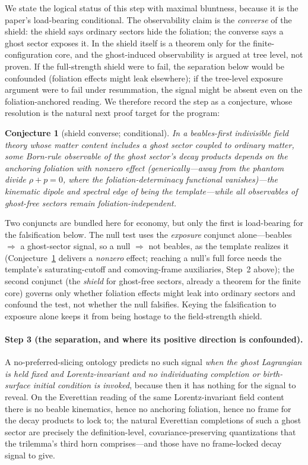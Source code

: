 \documentclass[11pt]{article}
\newtheorem{conjecture}{Conjecture}
\theoremstyle{remark}
\begin{document}
We state the logical status of this step with maximal bluntness,
because it is the paper's load-bearing conditional. The observability
claim is the \emph{converse} of the shield: the shield says ordinary
sectors hide the foliation; the converse says a ghost sector exposes
it. In \cite{instantaneous} the shield itself is a theorem only for
the finite-configuration core, and the ghost-induced observability is
argued at tree level, not proven. If the full-strength shield were to
fail, the separation below would be confounded (foliation effects
might leak elsewhere); if the tree-level exposure argument were to
fail under resummation, the signal might be absent even on the
foliation-anchored reading. We therefore record the step as a
conjecture, whose resolution is the natural next proof target for the
program:

\begin{conjecture}[shield converse; conditional]
\label{conj:converse}
In a beables-first indivisible field theory whose matter content
includes a ghost sector coupled to ordinary matter, some Born-rule
observable of the ghost sector's decay products depends on the
anchoring foliation with nonzero effect (generically---away from the
phantom divide $\rho+p=0$, where the foliation-determinacy functional
vanishes)---the kinematic dipole and
spectral edge of \cite{instantaneous} being the template---while all
observables of ghost-free sectors remain foliation-independent.
\end{conjecture}

Two conjuncts are bundled here for economy, but only the first is
load-bearing for the falsification below. The null test uses the
\emph{exposure} conjunct alone---beables $\Rightarrow$ a ghost-sector
signal, so a null $\Rightarrow$ not beables, as the template realizes
it (Conjecture~\ref{conj:converse} delivers a \emph{nonzero} effect;
reaching a null's full force needs the template's saturating-cutoff and
comoving-frame auxiliaries, Step~2 above); the second conjunct (the
\emph{shield} for ghost-free sectors, already a theorem for the finite
core) governs only whether foliation effects might leak into ordinary
sectors and confound the test, not whether the null falsifies. Keying
the falsification to exposure alone keeps it from being hostage to the
field-strength shield.

\paragraph{Step 3 (the separation, and where its positive direction is
confounded).} A no-preferred-slicing ontology predicts no such signal
\emph{when the ghost Lagrangian is held fixed and Lorentz-invariant and
no individuating completion or birth-surface initial condition is
invoked}, because then it has nothing for the signal to reveal. On the Everettian
reading of the same Lorentz-invariant field content there is no beable
kinematics, hence no anchoring foliation, hence no frame for the decay
products to lock to; the natural Everettian completions of such a ghost
sector are precisely the definition-level, covariance-preserving
quantizations that the trilemma's third horn comprises---and those have
no frame-locked decay signal to give.
\end{document}
